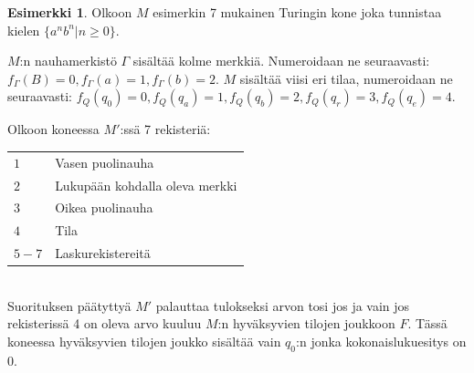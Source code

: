 \documentclass[a4paper, 12pt]{article}
\theoremstyle{definition}
\newtheorem{example}[mydef]{Esimerkki}
\theoremstyle{plain}
\begin{document}
\begin{example}
Olkoon $M$ esimerkin 7 mukainen Turingin kone joka tunnistaa kielen $\{a^nb^n | n \geq 0\}$.

$M$:n nauhamerkistö $\Gamma$ sisältää kolme merkkiä. Numeroidaan ne seuraavasti: $f_\Gamma(B) = 0, f_\Gamma(a) = 1, f_\Gamma(b) = 2$. $M$ sisältää viisi eri tilaa, numeroidaan ne seuraavasti: $f_Q(q_0) = 0, f_Q(q_a) = 1, f_Q(q_b) = 2, f_Q(q_r) = 3, f_Q(q_e) = 4$.

Olkoon koneessa $M'$:ssä 7 rekisteriä:

\begin{tabular} [t]{l l}
$1$ & Vasen puolinauha \\
$2$ & Lukupään kohdalla oleva merkki \\
$3$ & Oikea puolinauha \\
$4$ & Tila \\
$5 - 7$ & Laskurekistereitä \\
\end{tabular}
\\

Suorituksen päätyttyä $M'$ palauttaa tulokseksi arvon tosi jos ja vain jos rekisterissä 4 on oleva arvo kuuluu $M$:n hyväksyvien tilojen joukkoon $F$. Tässä koneessa hyväksyvien tilojen joukko sisältää vain $q_0$:n jonka kokonaislukuesitys on 0.


\end{example}
\end{document}
